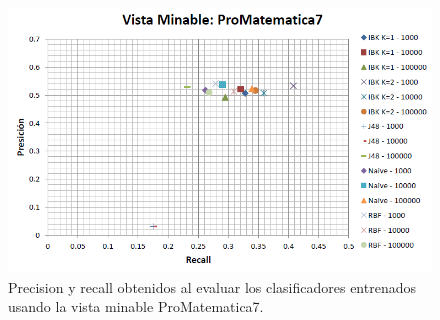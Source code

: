 \documentclass{article}
\begin{document}
\begin{figure}[!htb]
\begin{centering}
\includegraphics[scale=0.75]{promatematica7}
\par\end{centering}
\caption{Precision y recall obtenidos al evaluar los clasificadores entrenados usando la vista minable ProMatematica7.}
\label{fig:figura16}
\end{figure}
\end{document}
